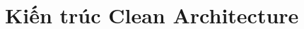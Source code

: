 \documentclass[../DoAn.tex]{subfiles}
\begin{document}



\section{Kiến trúc Clean Architecture}
\label{section:clean_architecture}
\end{document}
